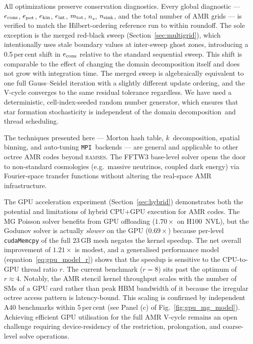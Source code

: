 \documentclass[fleqn,usenatbib]{mnras}
\newcommand{\ramses}{\textsc{ramses}}
\newcommand{\ksec}{\ensuremath{k}\text{-section}}
\newcommand{\code}[1]{\texttt{#1}}
\newcommand{\mpi}[0]{\texttt{MPI}}
\newcommand{\dd}[0]{{domain decomposition}}
\begin{document}
All optimizations preserve conservation diagnostics.  Every global diagnostic ---
$e_{\rm cons}$, $e_{\rm pot}$, $e_{\rm kin}$, $e_{\rm int}$,
$m_{\rm tot}$, $n_\star$, $n_{\rm sink}$, and the total number of AMR
grids --- is verified to match the Hilbert-ordering reference run to
within roundoff.  The sole exception is the merged red-black sweep
(Section~\ref{sec:multigrid}), which intentionally uses stale boundary
values at inter-sweep ghost zones, introducing a 0.5\,per\,cent shift
in $e_{\rm cons}$ relative to the standard sequential sweep.  This shift
is comparable to the effect of changing the domain decomposition itself
and does not grow with integration time. The merged sweep is algebraically
equivalent to one full Gauss--Seidel iteration with a slightly different
update ordering, and the V-cycle converges to the same residual tolerance
regardless.  We have used a deterministic, cell-index-seeded random
number generator, which ensures that star formation stochasticity is
independent of the \dd\ and thread scheduling.

The techniques presented here --- Morton hash table, \ksec\
decomposition, spatial binning, and auto-tuning \mpi\ backends --- are
general and applicable to other octree AMR codes beyond \ramses.
The FFTW3 base-level solver opens the door to non-standard
cosmologies (e.g.\ massive neutrinos, coupled dark energy) via
Fourier-space transfer functions without altering the real-space AMR
infrastructure.

The GPU acceleration experiment (Section~\ref{sec:hybrid}) demonstrates
both the potential and limitations of hybrid CPU+GPU execution for AMR
codes.  The MG Poisson solver benefits from GPU offloading
($1.70\times$ on H100~NVL), but the Godunov solver is actually
\emph{slower} on the GPU ($0.69\times$) because per-level
\code{cudaMemcpy} of the full 23\,GB mesh negates the kernel speedup.
The net overall improvement of $1.21\times$ is modest, and a
generalised performance model (equation~\ref{eq:gpu_model_r}) shows
that the speedup is sensitive to the CPU-to-GPU thread ratio $r$.
The current benchmark ($r = 8$) sits past the optimum of $r \approx 4$.
Notably, the AMR stencil kernel throughput scales with the number
of SMs of a GPU card rather than peak HBM bandwidth of it because the irregular octree
access pattern is latency-bound. This scaling is confirmed by
independent A40 benchmarks within 5\,per\,cent (see Panel (c) of Fig.~\ref{fig:gpu_mg_model}).
Achieving efficient GPU utilisation for the full AMR V-cycle remains an
open challenge requiring device-residency of the restriction,
prolongation, and coarse-level solve operations.
\end{document}
